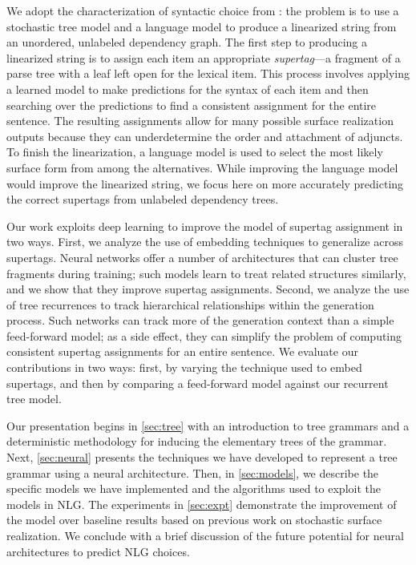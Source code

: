\documentclass[11pt]{article}
\begin{document}
We adopt the characterization of syntactic choice from
: the problem is to use a stochastic
tree model and a language model to produce a linearized string from an
unordered, unlabeled dependency graph.
%
The first step to producing a linearized string is to assign each item
an appropriate \emph{supertag}---a fragment of a parse tree with a
leaf left open for the lexical item.
%
This process involves applying a learned model to make predictions for
the syntax of each item and then searching over the predictions to
find a consistent assignment for the entire sentence.
%
The resulting assignments allow for many possible surface realization
outputs because they can underdetermine the order and attachment of
adjuncts.
%
To finish the linearization, a language model is used to select the
most likely surface form from among the alternatives.
%
While improving the language model would improve the linearized string,
we focus here on more accurately predicting the correct supertags from
unlabeled dependency trees.

Our work exploits deep learning to improve the model of supertag
assignment in two ways.
%
First, we analyze the use of embedding techniques to generalize across
supertags.  
%
Neural networks offer a number of architectures that can cluster tree
fragments during training; such models learn to treat related structures
similarly, and we show that they improve supertag assignments.
%
Second, we analyze the use of tree recurrences to track hierarchical
relationships within the generation process.
%
Such networks can track more of the generation context than a simple
feed-forward model; as a side effect, they can simplify the problem of
computing consistent supertag assignments for an entire sentence.
%
We evaluate our contributions in two ways: first, by varying the
technique used to embed supertags, and then by comparing a
feed-forward model against our recurrent tree model.

Our presentation begins in \ref{sec:tree} with an introduction to tree
grammars and a deterministic methodology for inducing the elementary
trees of the grammar.
%
Next, \ref{sec:neural} presents the techniques we have developed to
represent a tree grammar using a neural architecture.
%
Then, in \ref{sec:models}, we describe the specific models we have
implemented and the algorithms used to exploit the models in NLG.
%
The experiments in \ref{sec:expt} demonstrate the improvement of the
model over baseline results based on previous work on stochastic
surface realization.
%
We conclude with a brief discussion of the future potential for neural
architectures to predict NLG choices.
\end{document}
